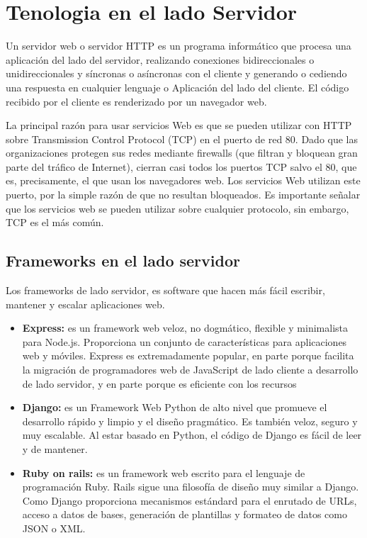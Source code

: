 \section{Tenologia en el lado Servidor}

Un servidor web o servidor HTTP es un programa informático que procesa una aplicación del lado del servidor, realizando conexiones bidireccionales o unidireccionales y síncronas o asíncronas con el cliente y generando o cediendo una respuesta en cualquier lenguaje o Aplicación del lado del cliente. El código recibido por el cliente es renderizado por un navegador web. 

La principal razón para usar servicios Web es que se pueden utilizar con HTTP sobre Transmission Control Protocol (TCP) en el puerto de red 80. Dado que las organizaciones protegen sus redes mediante firewalls (que filtran y bloquean gran parte del tráfico de Internet), cierran casi todos los puertos TCP salvo el 80, que es, precisamente, el que usan los navegadores web. Los servicios Web utilizan este puerto, por la simple razón de que no resultan bloqueados. Es importante señalar que los servicios web se pueden utilizar sobre cualquier protocolo, sin embargo, TCP es el más común.

\subsection*{Frameworks en el lado servidor}
Los frameworks de lado servidor, es software que hacen más fácil escribir, mantener y escalar aplicaciones web.
\begin{itemize}
    \item \textbf{Express: } es un framework web veloz, no dogmático, flexible y minimalista para Node.js. Proporciona un conjunto de características para aplicaciones web y móviles. Express es extremadamente popular, en parte porque facilita la migración de programadores web de JavaScript de lado cliente a desarrollo de lado servidor, y en parte porque es eficiente con los recursos
    \item \textbf{Django: } es un Framework Web Python de alto nivel que promueve el desarrollo rápido y limpio y el diseño pragmático. Es también veloz, seguro y muy escalable. Al estar basado en Python, el código de Django es fácil de leer y de mantener.

    \item \textbf{Ruby on rails: } es un framework web escrito para el lenguaje de programación Ruby. Rails sigue una filosofía de diseño muy similar a Django. Como Django proporciona mecanismos estándard para el enrutado de URLs, acceso a datos de bases, generación de plantillas y formateo de datos como JSON o XML. 
\end{itemize}

